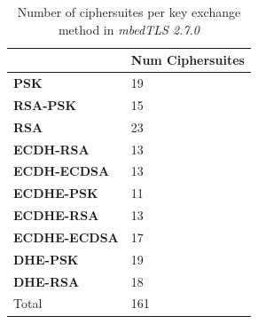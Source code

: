 \documentclass{llncs}
\begin{document}
\begin{table}[]
\begin{tabular}{ll}
\hline
\multicolumn{1}{|l|}{}                     & \multicolumn{1}{l|}{\textbf{Num Ciphersuites}} \\ \hline
\multicolumn{1}{|l|}{\textbf{PSK}}         & \multicolumn{1}{l|}{19}                        \\ \hline
\multicolumn{1}{|l|}{\textbf{RSA-PSK}}     & \multicolumn{1}{l|}{15}                        \\ \hline
\multicolumn{1}{|l|}{\textbf{RSA}}         & \multicolumn{1}{l|}{23}                        \\ \hline
\multicolumn{1}{|l|}{\textbf{ECDH-RSA}}    & \multicolumn{1}{l|}{13}                        \\ \hline
\multicolumn{1}{|l|}{\textbf{ECDH-ECDSA}}  & \multicolumn{1}{l|}{13}                        \\ \hline
\multicolumn{1}{|l|}{\textbf{ECDHE-PSK}}   & \multicolumn{1}{l|}{11}                        \\ \hline
\multicolumn{1}{|l|}{\textbf{ECDHE-RSA}}   & \multicolumn{1}{l|}{13}                        \\ \hline
\multicolumn{1}{|l|}{\textbf{ECDHE-ECDSA}} & \multicolumn{1}{l|}{17}                        \\ \hline
\multicolumn{1}{|l|}{\textbf{DHE-PSK}}     & \multicolumn{1}{l|}{19}                        \\ \hline
\multicolumn{1}{|l|}{\textbf{DHE-RSA}}     & \multicolumn{1}{l|}{18}                        \\ \hline
Total                                      & 161
\end{tabular}
\centering
\centering \caption{\label{table:mbedtls-num-ciphers} Number of ciphersuites per key exchange method in \textit{mbedTLS 2.7.0}}
\end{table}
\end{document}
